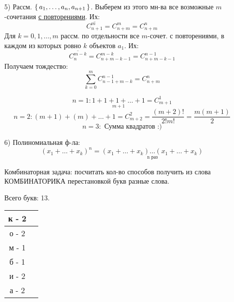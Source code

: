 \begin{itemize}
\begin{proof}
\begin{itemize}
    Выберем из этого мн-ва все возм. $n$-сочетания без повторений. Их $C_{2n}^{n}$ \\
    \[
    \set{\underset{k\text{ объектов}}{a_1, \ldots, a_n}; \underset{n - k \text{ объектов}}{a_{n + 1}, \ldots a_{2n}}}
    \]
    Из левой половины выбираем $k$ обЪектов, из левой соотв. - $n - k$. Кол-во способов так сделать:
    \[
    C_{n}^{k}C_{n}^{n - k} = (C_{n}^{k})^{2}
    \]
    Складывая по всем $k$:
    \[
    \sum_{k = 0}^{n} (C_{n}^{k})^{2} = C_{2n}^{n}
    \]
\end{itemize}
\end{proof}
\underline{Вопрос}: $\sum_{k = 0}^{n} (C_{n}^{k})^{4}$
\item [5) ] Рассм. $\set{a_1, \ldots, a_n, a_{n + 1}}$. Выберем из этого мн-ва все возможные $m$-сочетания \underline{с повторениями}. Их:
  \[
    \overline{C_{n + 1}^{m}} = C_{n + m}^{m} = C_{n + m}^{n}
  \]
  Для $k = 0, 1, \ldots, m$ рассм. по отдельности все $m$-сочет. с повторениями, в каждом из которых ровно $k$ объектов $a_1$. Их:
  \[
  \overline{C_{n}^{m - k}} = C_{n + m - k - 1}^{m - k} = C_{n + m - k - 1}^{n - 1}
  \]
  Получаем тождество:
  \[
 \sum_{k = 0}^{m} C_{n - 1 + m - k}^{n - 1} = C_{n + m}^{n} 
  \]
\begin{consequence}
  \[
    n = 1\colon \underset{m + 1}{1 + 1 + 1 + \ldots + 1} = C_{m + 1}^{1}
  \]
  \[
    n = 2\colon (m + 1) + (m) + \ldots + 1 = C_{m + 2}^{2} = \frac{(m + 2)!}{2!m!} = \frac{m(m + 1)}{2}
  \]
  \[
  n = 3\colon \text{ Сумма квадратов :)}
  \]
\end{consequence}
 \item [6) ] Полиномиальная ф-ла:
   \[
     (x_1 + \ldots + x_k)^{n} = \underset{\text{n раз}}{(x_1 + \ldots + x_k) \ldots (x_1 + \ldots + x_k)}
   \]
   \begin{task}
   Комбинаторная задача: посчитать кол-во способов получить из слова КОМБИНАТОРИКА перестановкой букв разные слова.
   \end{task}
   \begin{solution}
   Всего букв: 13.
    \begin{center}
    \begin{tabular}{ |c|c| } 
     \hline
    к - 2 \\ 
     \hline
     о - 2 \\
     \hline
     м - 1 \\
     \hline
     б - 1 \\
     \hline
     и - 2 \\
     \hline
    а - 2 \\

\end{tabular}
\end{center}
\end{solution}
\end{itemize}
